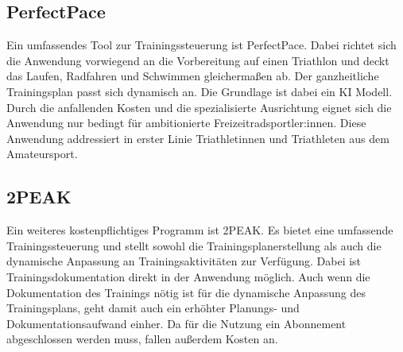\subsection{PerfectPace}
Ein umfassendes Tool zur Trainingssteuerung ist PerfectPace\cite{PerfectPaceWeb}. Dabei richtet sich die Anwendung vorwiegend an die Vorbereitung auf einen Triathlon und deckt das Laufen, Radfahren und Schwimmen gleichermaßen ab. Der ganzheitliche Trainingsplan passt sich dynamisch an. Die Grundlage ist dabei ein KI Modell. Durch die anfallenden Kosten und die spezialisierte Ausrichtung eignet sich die Anwendung nur bedingt für ambitionierte Freizeitradsportler:innen. Diese Anwendung addressiert in erster Linie Triathletinnen und Triathleten aus dem Amateursport.

\subsection{2PEAK}
Ein weiteres kostenpflichtiges Programm ist 2PEAK\cite{2PeakWeb}. Es bietet eine umfassende Trainingssteuerung und stellt sowohl die Trainingsplanerstellung als auch die dynamische Anpassung an Trainingsaktivitäten zur Verfügung. Dabei ist Trainingsdokumentation direkt in der Anwendung möglich. Auch wenn die Dokumentation des Trainings nötig ist für die dynamische Anpassung des Trainingsplans, geht damit auch ein erhöhter Planungs- und Dokumentationsaufwand einher. Da für die Nutzung ein Abonnement abgeschlossen werden muss, fallen außerdem Kosten an.
